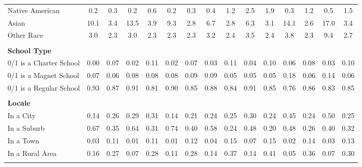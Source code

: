 \begin{tabular*}{\linewidth}{@{\extracolsep{\fill} } lcccccccccccccc}
\hspace{0.2cm}Native American&0.2&0.3&0.2&0.6&0.2&0.3&0.4&1.2&2.5&1.9&0.3&1.2&0.5&1.5\\%
\hspace{0.2cm}Asian&10.1&3.4&13.5&3.9&9.3&2.8&6.7&2.8&6.3&3.1&14.1&2.6&17.0&3.4\\%
\hspace{0.2cm}Other Race&3.0&2.3&3.0&2.3&2.3&2.3&3.2&2.4&3.5&2.4&3.8&2.3&9.4&2.7\\%
&&&&&&&&&&&&&&\\%
\multicolumn{15}{l}{\bfseries School Type}\\%
\hspace{0.2cm}0/1 is a Charter School&0.00&0.07&0.02&0.11&0.02&0.07&0.03&0.11&0.04&0.10&0.06&0.08&0.03&0.10\\%
\hspace{0.2cm}0/1 is a Magnet School&0.07&0.06&0.08&0.08&0.08&0.09&0.09&0.05&0.05&0.05&0.18&0.06&0.14&0.06\\%
\hspace{0.2cm}0/1 is a Regular School&0.93&0.87&0.91&0.81&0.90&0.85&0.88&0.84&0.91&0.85&0.76&0.86&0.83&0.85\\%
&&&&&&&&&&&&&&\\%
\multicolumn{15}{l}{\bfseries Locale}\\%
\hspace{0.2cm}In a City&0.14&0.26&0.29&0.31&0.14&0.21&0.24&0.25&0.30&0.24&0.45&0.24&0.50&0.25\\%
\hspace{0.2cm}In a Suburb&0.67&0.35&0.64&0.31&0.74&0.40&0.58&0.24&0.48&0.20&0.48&0.26&0.40&0.32\\%
\hspace{0.2cm}In a Town&0.03&0.11&0.01&0.11&0.01&0.12&0.04&0.15&0.07&0.15&0.02&0.14&0.03&0.13\\%
\hspace{0.2cm}In a Rural Area&0.16&0.27&0.07&0.28&0.11&0.28&0.14&0.37&0.14&0.41&0.05&0.36&0.07&0.30\\%
&&&&&&&&&&&&&&\\%
\hline%
\end{tabular*}